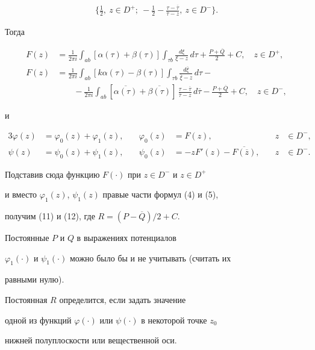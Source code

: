 \begin{pf}
\begin{align*}
\bigg\{ \frac{1}{2},\ z\in D^+;


\ - \frac{1}{2} - \frac{\tau-\overline{\tau}}{\overline{\tau}-z},


\ z\in D^- \bigg\} .


\end{align*}


Тогда


\begin{align*}


F(z) &= \frac{1}{2\pi i}\int_{ab} [\alpha(\tau)+\beta(\tau)]


\int_{\tau b}\frac{d\xi}{\xi-z}\,d\tau + \frac{P+\overline{Q}}{2}+C,


\quad z\in D^+, \\


%


F(z) &= \frac{1}{2\pi i}\int_{ab} [k\alpha(\tau)-\beta(\tau)]


\int_{\tau b}\frac{d\overline{\xi}}{\overline{\xi}-z}\,d\tau - \\


%


&\qquad - \frac{1}{2\pi i}\int_{ab} [\overline{\alpha(\tau)}


+\overline{\beta(\tau)}]


\,\frac{\tau-\overline{\tau}}{\overline{\tau}-z}\,d\overline{\tau}


- \frac{P+\overline{Q}}{2}+C,


\quad z\in D^-,


\end{align*}


и


\begin{alignat*}{3}


\varphi(z)&=\varphi_0(z)+\varphi_1(z),&\quad


\varphi_0(z)&=F(z),&\quad z&\in D^-, \\


%


\psi(z)&=\psi_0(z)+\psi_1(z),&\quad


\psi_0(z)&=-zF'(z)-\overline{F(\overline{z})},&\quad z&\in D^-.


\end{alignat*}


Подставив сюда функцию $F(\cdot)$ при $z\in D^-$ и $z\in D^+$


и вместо $\varphi_1(z)$, $\psi_1(z)$ правые части формул (4) и (5),


получим (11) и (12), где $R=(P-\overline{Q})/2+C$.


Постоянные $P$ и $Q$ в выражениях потенциалов


$\varphi_1(\cdot)$ и $\psi_1(\cdot)$ можно было бы и не учитывать (считать их


равными нулю).





Постоянная $R$ определится, если задать значение


одной из функций $\varphi(\cdot)$ или $\psi(\cdot)$ в некоторой точке $z_0$


нижней полуплоскости или вещественной оси.


\end{pf}
